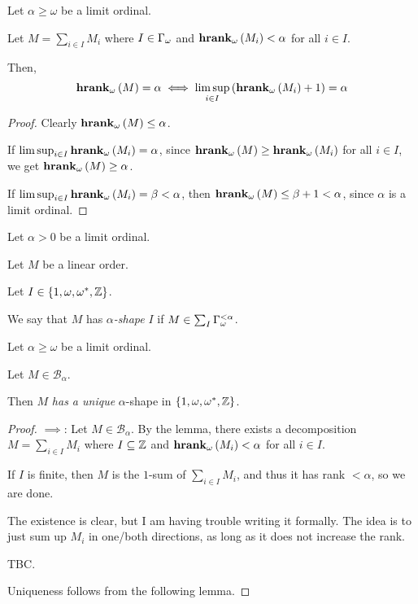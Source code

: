 \begin{lemma}
  Let $\alpha \ge \omega$ be a limit ordinal.

  Let $M = \sum_{i \in I} M_i$ where $I \in \Gamma_{\omega}$ and $\mathbf{hrank}_{\omega}\left( M_i \right) < \alpha$
  for all $i \in I$.

  Then,
  \[\mathbf{hrank}_{\omega}\left( M \right) = \alpha \iff \limsup_{i \in I} \left( {\mathbf{hrank}_{\omega}\left( M_i \right)+1} \right) = \alpha\]
\end{lemma}

\begin{proof}
  Clearly $\mathbf{hrank}_{\omega}\left( M \right) \le \alpha$.
  
  If $\limsup_{i \in I}{\mathbf{hrank}_{\omega}\left( M_i \right)} = \alpha$,
  since $\mathbf{hrank}_{\omega}\left( M \right) \ge \mathbf{hrank}_{\omega}\left( M_i \right)$ for all $i \in I$,
  we get $\mathbf{hrank}_{\omega}\left( M \right) \ge \alpha$.

  If $\limsup_{i \in I}{\mathbf{hrank}_{\omega}\left( M_i \right)} = \beta < \alpha$,
  then $\mathbf{hrank}_{\omega}\left( M \right) \le \beta + 1 < \alpha$, since 
  $\alpha$ is a limit ordinal.
\end{proof}

\begin{definition}
  Let $\alpha > 0$ be a limit ordinal.

  Let $M$ be a linear order.

  Let $I \in \left\{ {1, \omega, \omega^\ast, \mathbb{Z}} \right\}$.

  We say that $M$ has \emph{$\alpha$-shape} $I$ if
  $M \in \sum_{I}{\Gamma_{\omega}^{< \alpha}}$.
\end{definition}


\begin{lemma}
  Let $\alpha \ge \omega$ be a limit ordinal.

  Let $M \in \mathcal{B}_{\alpha}$.
  
  Then $M$ \emph{has a unique} $\alpha$-shape in $\left\{ {1, \omega, \omega^\ast, \mathbb{Z}} \right\}$.
\end{lemma}

\begin{proof}
  $\implies$: Let $M \in \mathcal{B}_{\alpha}$. By the lemma,
  there exists a decomposition $M = \sum_{i \in I} M_i$ where
  $I \subseteq \mathbb{Z}$ and $\mathbf{hrank}_{\omega}\left( M_i \right) < \alpha$ for all $i \in I$.

  If $I$ is finite, then $M$ is the $1$-sum of $\sum_{i \in I} M_i$,
  and thus it has rank $< \alpha$, so we are done.

  The existence is clear, but I am having trouble writing
  it formally. The idea is to just sum up $M_i$ in one/both directions,
  as long as it does not increase the rank.

  TBC.

  Uniqueness follows from the following lemma.
\end{proof}

